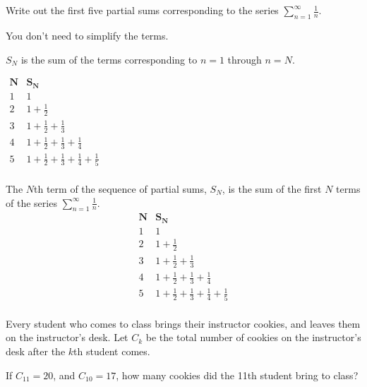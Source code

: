 %
%

\subsection*{\Conceptual}
\begin{question}
Write out the first five partial sums corresponding to the series
$\displaystyle\sum_{n=1}^{\infty} \frac{1}{n}$.

You don't need to simplify the terms.
\end{question}
\begin{hint}
$S_N$ is the sum of the terms corresponding to $n=1$ through $n=N$.
\end{hint}
\begin{answer}

$\begin{array}{l|l}
\mathbf{N}&\mathbf{S_N}\\
\hline
1 & 1\\[7pt]
2 & 1+\frac12\\[7pt]
3 & 1+\frac12 + \frac13\\[7pt]
4 & 1+\frac12 + \frac13+\frac14\\[7pt]
5 & 1+\frac12 + \frac13+\frac14+\frac15\\[7pt]
\end{array}$
\end{answer}
\begin{solution}
The $N$th term of the sequence of partial sums, $S_N$, is the sum of the first $N$ terms of the series $\displaystyle\sum_{n=1}^{\infty} \frac{1}{n}$.
\[\begin{array}{l|l}
\mathbf{N}&\mathbf{S_N}\\
\hline
1 & 1\\[7pt]
2 & 1+\frac12\\[7pt]
3 & 1+\frac12 + \frac13\\[7pt]
4 & 1+\frac12 + \frac13+\frac14\\[7pt]
5 & 1+\frac12 + \frac13+\frac14+\frac15\\[7pt]
\end{array}
\]\end{solution}
\begin{Mquestion}\label{prob_s3.2:cookies}
Every student who comes to class brings their instructor cookies, and leaves them on the instructor's desk. Let $C_k$ be the total number of cookies on the instructor's desk after the $k$th student comes.

If $C_{11}=20$, and $C_{10}=17$, how many cookies did the 11th student bring to class?
\end{Mquestion}
